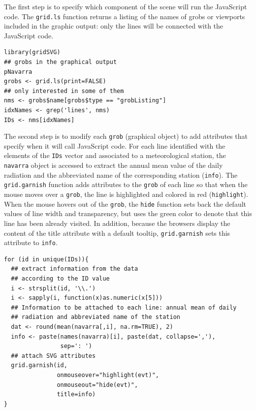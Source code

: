 \documentclass[smallroyalvopaper]{memoir}
\begin{document}
The first step is to specify which component of the scene
will run the JavaScript code. The \texttt{grid.ls} function  returns a
listing of the names of grobs or viewports included in the graphic
output: only the lines will be connected with the JavaScript
code. 


\lstset{language=R,numbers=none}
\begin{lstlisting}
library(gridSVG)
## grobs in the graphical output
pNavarra
grobs <- grid.ls(print=FALSE)
## only interested in some of them
nms <- grobs$name[grobs$type == "grobListing"]
idxNames <- grep('lines', nms)
IDs <- nms[idxNames]
\end{lstlisting}

The second step is to modify each \texttt{grob} (graphical object) to add
attributes that specify when it will call JavaScript code. For each
line identified with the elements of the \texttt{IDs} vector and associated
to a meteorological station, the \texttt{navarra} object is accessed to
extract the annual mean value of the daily radiation and the
abbreviated name of the corresponding station (\texttt{info}).  The
\texttt{grid.garnish} function adds attributes to the \texttt{grob} of each line so
that when the mouse moves over a \texttt{grob}, the line is highlighted and
colored in red (\texttt{highlight}). When the mouse hovers out of the \texttt{grob},
the \texttt{hide} function sets back the default values of line width and
transparency, but uses the green color to denote that this line has
been already visited. In addition, because the browsers display the
content of the title attribute with a default tooltip, \texttt{grid.garnish}
sets this attribute to \texttt{info}.


\lstset{language=R,numbers=none}
\begin{lstlisting}
for (id in unique(IDs)){
  ## extract information from the data
  ## according to the ID value
  i <- strsplit(id, '\\.')
  i <- sapply(i, function(x)as.numeric(x[5]))
  ## Information to be attached to each line: annual mean of daily
  ## radiation and abbreviated name of the station
  dat <- round(mean(navarra[,i], na.rm=TRUE), 2)
  info <- paste(names(navarra)[i], paste(dat, collapse=','),
                sep=': ')
  ## attach SVG attributes
  grid.garnish(id,
               onmouseover="highlight(evt)",
               onmouseout="hide(evt)",
               title=info)
}
\end{lstlisting}
\end{document}
